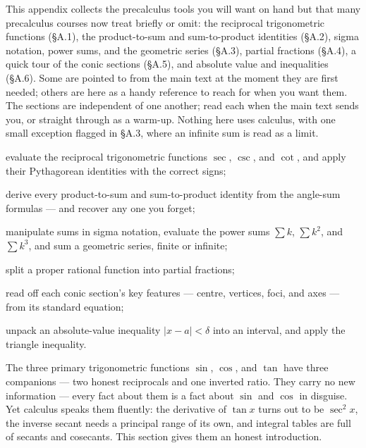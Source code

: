 \documentclass[a4paper,12pt,oneside]{memoir}
\begin{document}
\begin{lead}
This appendix collects the precalculus tools you will want on hand but that many precalculus courses now treat briefly or omit: the reciprocal trigonometric functions (§A.1), the product-to-sum and sum-to-product identities (§A.2), sigma notation, power sums, and the geometric series (§A.3), partial fractions (§A.4), a quick tour of the conic sections (§A.5), and absolute value and inequalities (§A.6). Some are pointed to from the main text at the moment they are first needed; others are here as a handy reference to reach for when you want them. The sections are independent of one another; read each when the main text sends you, or straight through as a warm-up. Nothing here uses calculus, with one small exception flagged in §A.3, where an infinite sum is read as a limit.
\end{lead}
\begin{objectives}
  \item evaluate the reciprocal trigonometric functions \(\sec\), \(\csc\), and \(\cot\), and apply their Pythagorean identities with the correct signs;
  \item derive every product-to-sum and sum-to-product identity from the angle-sum formulas — and recover any one you forget;
  \item manipulate sums in sigma notation, evaluate the power sums \(\sum k\), \(\sum k^{2}\), and \(\sum k^{3}\), and sum a geometric series, finite or infinite;
  \item split a proper rational function into partial fractions;
  \item read off each conic section’s key features — centre, vertices, foci, and axes — from its standard equation;
  \item unpack an absolute-value inequality \(|x - a| < \delta\) into an interval, and apply the triangle inequality.
\end{objectives}
The three primary trigonometric functions \(\sin\), \(\cos\), and \(\tan\) have three companions — two honest reciprocals and one inverted ratio. They carry no new information — every fact about them is a fact about \(\sin\) and \(\cos\) in disguise. Yet calculus speaks them fluently: the derivative of \(\tan x\) turns out to be \(\sec^{2} x\), the inverse secant needs a principal range of its own, and integral tables are full of secants and cosecants. This section gives them an honest introduction.
\end{document}
